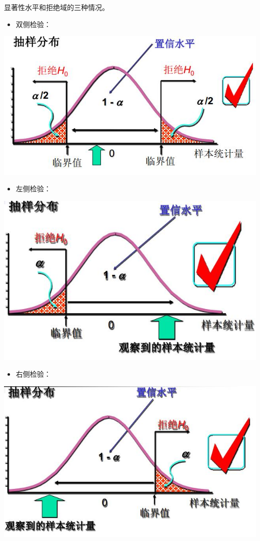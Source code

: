 \documentclass[]{ctexbook}
\providecommand{\tightlist}{%
  \setlength{\itemsep}{0pt}\setlength{\parskip}{0pt}}
\begin{document}
显著性水平和拒绝域的三种情况。

\begin{itemize}
\tightlist
\item
  双侧检验：
\end{itemize}

\includegraphics[width=1\linewidth,height=0.35\textheight]{fig/fig15}

\begin{itemize}
\tightlist
\item
  左侧检验：
\end{itemize}

\includegraphics[width=1\linewidth,height=0.35\textheight]{fig/fig16}

\begin{itemize}
\tightlist
\item
  右侧检验：
\end{itemize}

\includegraphics[width=1\linewidth,height=0.35\textheight]{fig/fig17}
\end{document}
